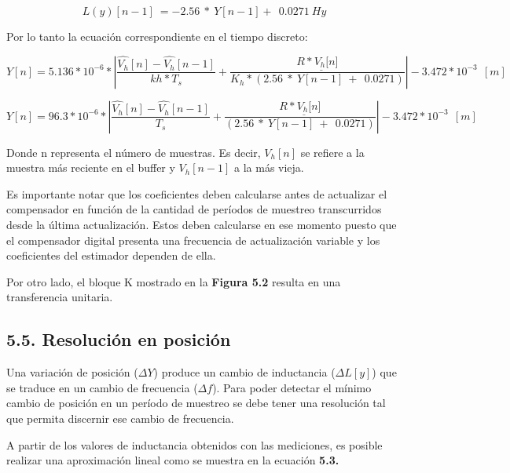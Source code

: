 \documentclass{article} %
\begin{document}
\noindent 
\begin{equation} \label{GrindEQ__5_2_} 
L(y)[n-1]\ =-2.56\ *\ Y[n-1]+\ \ 0.0271\ Hy 
\end{equation} 


\noindent Por lo tanto la ecuaci\'{o}n correspondiente en el tiempo discreto:

\noindent 
\[Y[n]=5.136*10^{-6}*\left|\frac{\widehat{V_h}[n]-\widehat{V_h}[n-1]}{kh*T_s}+\frac{R*\underline{V_h[}n]}{K_h*(2.56\ *\ Y[n-1]\ +\ \ 0.0271)}\right|-3.472*10^{-3}\ \ [m]\ \] 

\[Y[n]=96.3*10^{-6}*\left|\frac{\widehat{V_h}[n]-\widehat{V_h}[n-1]}{T_s}+\frac{R*\underline{V_h[}n]}{(2.56\ *\ Y[n-1]\ +\ \ 0.0271)}\right|-3.472*10^{-3}\ \ [m]\ \] 


\noindent Donde n representa el n\'{u}mero de muestras. Es decir, $V_h[n]$ se refiere a la muestra m\'{a}s reciente en el buffer y $V_h[n-1]$ a la m\'{a}s vieja.

\noindent 

\noindent Es importante notar que los coeficientes deben calcularse antes de actualizar el compensador en funci\'{o}n de la cantidad de per\'{i}odos de muestreo transcurridos desde la \'{u}ltima actualizaci\'{o}n. Estos deben calcularse en ese momento puesto que el compensador digital presenta una frecuencia de actualizaci\'{o}n variable y los coeficientes del estimador dependen de ella.

\noindent 

\noindent Por otro lado, el bloque K mostrado en la\textbf{ Figura 5.2} resulta en una transferencia unitaria.

\noindent 
\subsection{5.5. Resoluci\'{o}n en posici\'{o}n}

\noindent Una variaci\'{o}n de posici\'{o}n ($\mathit{\Delta}Y$) produce un cambio de inductancia ($\mathit{\Delta}L[y]$) que se traduce en un cambio de frecuencia ($\mathit{\Delta}f$). Para poder detectar el m\'{i}nimo cambio de posici\'{o}n en un per\'{i}odo de muestreo se debe tener una resoluci\'{o}n tal que permita discernir ese cambio de frecuencia.

\noindent 

\noindent A partir de los valores de inductancia  obtenidos con las mediciones, es posible realizar una aproximaci\'{o}n lineal como se muestra en la ecuaci\'{o}n\textbf{ 5.3.}
\end{document}
